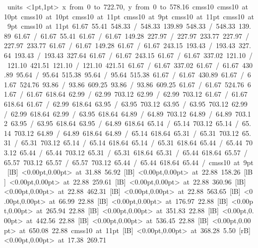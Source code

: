 \hbox{\beginpicture
\setcoordinatesystem units <1pt,1pt>
\setplotarea x from 0 to 722.70, y from 0 to 578.16
\setlinear
\font\picfont cmss10\picfont
\font\picfont cmss10 at 10pt\picfont
\font\picfont cmss10 at 10pt\picfont
\font\picfont cmss10 at 11pt\picfont
\font\picfont cmss10 at 9pt\picfont
\font\picfont cmss10 at 11pt\picfont
\font\picfont cmss10 at 9pt\picfont
\font\picfont cmss10 at 11pt\picfont
\setsolid
{} 61.67 55.41 548.33 /
 548.33 139.89 548.33 /
 548.33 139.89 61.67 /
 61.67 55.41 61.67 /
\setsolid
{} 61.67 149.28 227.97 /
 227.97 233.77 227.97 /
 227.97 233.77 61.67 /
 61.67 149.28 61.67 /
\setsolid
{} 61.67 243.15 193.43 /
 193.43 327.64 193.43 /
 193.43 327.64 61.67 /
 61.67 243.15 61.67 /
\setsolid
{} 61.67 337.02 121.10 /
 121.10 421.51 121.10 /
 121.10 421.51 61.67 /
 61.67 337.02 61.67 /
\setsolid
{} 61.67 430.89 95.64 /
 95.64 515.38 95.64 /
 95.64 515.38 61.67 /
 61.67 430.89 61.67 /
\setsolid
{} 61.67 524.76 93.86 /
 93.86 609.25 93.86 /
 93.86 609.25 61.67 /
 61.67 524.76 61.67 /
\setsolid
{} 61.67 618.64 62.99 /
 62.99 703.12 62.99 /
 62.99 703.12 61.67 /
 61.67 618.64 61.67 /
\setsolid
{} 62.99 618.64 63.95 /
 63.95 703.12 63.95 /
 63.95 703.12 62.99 /
 62.99 618.64 62.99 /
\setsolid
{} 63.95 618.64 64.89 /
 64.89 703.12 64.89 /
 64.89 703.12 63.95 /
 63.95 618.64 63.95 /
\setsolid
{} 64.89 618.64 65.14 /
 65.14 703.12 65.14 /
 65.14 703.12 64.89 /
 64.89 618.64 64.89 /
\setsolid
{} 65.14 618.64 65.31 /
 65.31 703.12 65.31 /
 65.31 703.12 65.14 /
 65.14 618.64 65.14 /
\setsolid
{} 65.31 618.64 65.44 /
 65.44 703.12 65.44 /
 65.44 703.12 65.31 /
 65.31 618.64 65.31 /
\setsolid
{} 65.44 618.64 65.57 /
 65.57 703.12 65.57 /
 65.57 703.12 65.44 /
 65.44 618.64 65.44 /
\font\picfont cmss10 at 9pt\picfont
{}  [lB] <0.00pt,0.00pt> at 31.88 56.92
  [lB] <0.00pt,0.00pt> at 22.88 158.26
  [lB] <0.00pt,0.00pt> at 22.88 259.61
  [lB] <0.00pt,0.00pt> at 22.88 360.96
  [lB] <0.00pt,0.00pt> at 22.88 462.31
  [lB] <0.00pt,0.00pt> at 22.88 563.65
  [lB] <0.00pt,0.00pt> at 66.99 22.88
  [lB] <0.00pt,0.00pt> at 176.97 22.88
  [lB] <0.00pt,0.00pt> at 265.94 22.88
  [lB] <0.00pt,0.00pt> at 351.83 22.88
  [lB] <0.00pt,0.00pt> at 442.56 22.88
  [lB] <0.00pt,0.00pt> at 536.45 22.88
  [lB] <0.00pt,0.00pt> at 650.08 22.88
\font\picfont cmss10 at 11pt\picfont
{}  [lB] <0.00pt,0.00pt> at 368.28 5.50
 [rB] <0.00pt,0.00pt> at 17.38 269.71
\endpicture
}
